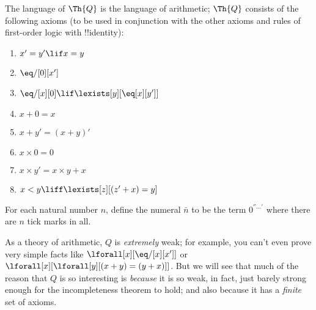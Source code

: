 \documentclass[../../include/open-logic-section]{subfiles}
\begin{document}

The language of $\Th{Q}$ is the language of
arithmetic; $\Th{Q}$ consists of the following axioms
(to be used in conjunction with the other axioms and rules of
first-order logic with !!{identity}):
\begin{enumerate}
\item $x' = y' \lif x = y$
\item $\eq/[0][x']$
\item $\eq/[x][0] \lif \lexists[y][\eq[x][y']]$
\item $x+0 = x$
\item $x+ y' = (x+y)'$
\item $x \times 0 = 0$
\item $x \times y' = x \times y + x$
\item $x < y \liff \lexists[z][(z' + x) = y]$
\end{enumerate}
For each natural number $n$, define the numeral $\bar n$ to be the
term $0^{''\ldots'}$ where there are $n$ tick marks in all.

As a theory of arithmetic, $Q$ is \emph{extremely} weak; for example,
you can't even prove very simple facts like $\lforall[x][\eq/[x][x']]$
or $\lforall[x][\lforall[y][(x+ y) = (y+x)]]$.  But we will see that
much of the reason that $Q$ is so interesting is \emph{because} it is
so weak, in fact, just barely strong enough for the incompleteness
theorem to hold; and also because it has a \emph{finite} set of
axioms.
\end{document}
